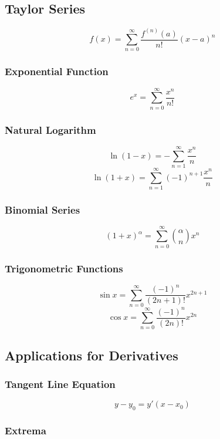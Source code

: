 \documentclass{article}
\begin{document}
\subsection{Taylor Series}

\[
    f(x) = \sum_{n=0}^{\infty} \frac{f^{(n)}(a)}{n!}(x - a)^n
\]

\subsubsection{Exponential Function}

\[
    e^x = \sum_{n=0}^{\infty} \frac{x^n}{n!}
\]

\subsubsection{Natural Logarithm}

\[
    \ln(1 - x) = -\sum_{n=1}^{\infty} \frac{x^n}{n}
\]
\[
    \ln(1 + x) = \sum_{n=1}^{\infty} (-1)^{n+1} \frac{x^n}{n}
\]

\subsubsection{Binomial Series}

\[
    (1 + x)^\alpha = \sum_{n=0}^{\infty} \binom{\alpha}{n} x^n
\]

\subsubsection{Trigonometric Functions}

\[
    \sin x = \sum_{n=0}^{\infty} \frac{(-1)^n}{(2n + 1)!} x^{2n + 1}
\]
\[
    \cos x = \sum_{n=0}^{\infty} \frac{(-1)^n}{(2n)!} x^{2n}
\]

\subsection{Applications for Derivatives}

\subsubsection{Tangent Line Equation}

\[
    y - y_0 = y'(x - x_0)
\]

\subsubsection{Extrema}
\end{document}
